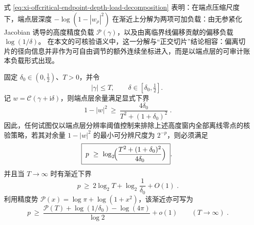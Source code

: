 \begin{remark}[端点深度的可加负载]\label{rem:xi-offcritical-endpoint-depth-additive-load}
式 \eqref{eq:xi-offcritical-endpoint-depth-load-decomposition} 表明：在端点压缩尺度下，端点层深度 \(-\log(1-|w_\rho|^2)\) 在渐近上分解为两项可加负载：由无参紧化 Jacobian 诱导的高度精度负载 \(\mathcal{P}(\gamma)\)，以及由离临界线偏移贡献的偏移负载 \(\log(1/\delta)\)。
在本文的可核验语义中，这一分解与“正交切片”结论相容：偏离切片的径向信息并非作为可自由调节的额外连续坐标进入，而是以端点层的可审计账本负载形式出现。
\end{remark}

\begin{theorem}\label{thm:xi-offcritical-endpoint-resolution-lower-bound}
固定 \(\delta_0\in(0,\tfrac12)\)、\(T>0\)，并令
\[
|\gamma|\le T,\qquad \delta\in[\delta_0,\tfrac12].
\]
记 \(w=\mathcal{C}(\gamma+\mathrm{i}\delta)\)，则端点层余量满足显式下界
\begin{equation}\label{eq:xi-offcritical-endpoint-margin-min}
\boxed{\;
1-|w|^2\ \ge\ \frac{4\delta_0}{T^2+(1+\delta_0)^2}\; }.
\end{equation}
因此，任何试图仅以端点层分辨率阈值控制来排除上述高度窗内全部离线零点的核验策略，若其对余量 \(1-|w|^2\) 的最小可分辨尺度为 \(2^{-p}\)，则必须满足
\begin{equation}\label{eq:xi-offcritical-endpoint-bit-lower-bound}
\boxed{\;
p\ \ge\ \log_2\!\Bigl(\frac{T^2+(1+\delta_0)^2}{4\delta_0}\Bigr)\; }.
\end{equation}
并且当 \(T\to\infty\) 时有渐近下界
\begin{equation}\label{eq:xi-offcritical-endpoint-bit-asymptotic}
\boxed{\;
p\ \ge\ 2\log_2 T+\log_2\!\frac{1}{\delta_0}+O(1)\; }.
\end{equation}
利用精度势 \(\mathcal{P}(x)=\log\pi+\log(1+x^2)\)，该渐近亦可写为
\begin{equation}\label{eq:xi-offcritical-endpoint-bit-precision-potential-form}
\boxed{\;
p\ \ge\ \frac{\mathcal{P}(T)+\log(1/\delta_0)-\log(4\pi)}{\log 2}+o(1)\qquad(T\to\infty)\; }.
\end{equation}
\end{theorem}

